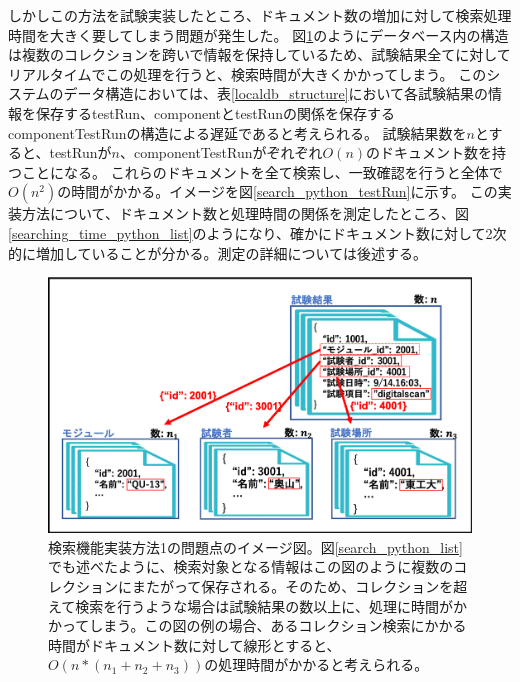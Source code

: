 しかしこの方法を試験実装したところ、ドキュメント数の増加に対して検索処理時間を大きく要してしまう問題が発生した。
図\ref{search_python_list_problem}のようにデータベース内の構造は複数のコレクションを跨いで情報を保持しているため、試験結果全てに対してリアルタイムでこの処理を行うと、検索時間が大きくかかってしまう。
このシステムのデータ構造においては、表\ref{localdb_structure}において各試験結果の情報を保存するtestRun、componentとtestRunの関係を保存するcomponentTestRunの構造による遅延であると考えられる。
試験結果数を$n$とすると、testRunが$n$、componentTestRunがぞれぞれ$O(n)$のドキュメント数を持つことになる。
これらのドキュメントを全て検索し、一致確認を行うと全体で$O(n^2)$の時間がかかる。イメージを図\ref{search_python_testRun}に示す。
この実装方法について、ドキュメント数と処理時間の関係を測定したところ、図\ref{searching_time_python_list}のようになり、確かにドキュメント数に対して2次的に増加していることが分かる。測定の詳細については後述する。
\begin{figure}[bpt]
  \begin{center}
    \includegraphics[width=12cm]{search_python_list_problem}
  \caption[検索機能実装方法1の問題点]
{検索機能実装方法1の問題点のイメージ図。図\ref{search_python_list}でも述べたように、検索対象となる情報はこの図のように複数のコレクションにまたがって保存される。そのため、コレクションを超えて検索を行うような場合は試験結果の数以上に、処理に時間がかかってしまう。この図の例の場合、あるコレクション検索にかかる時間がドキュメント数に対して線形とすると、$O(n*(n_1+n_2+n_3))$の処理時間がかかると考えられる。}
  \label{search_python_list_problem}
  \end{center}
\end{figure}

